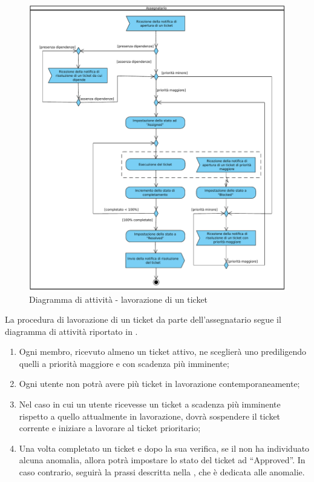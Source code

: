 \begin{figure}[H]
\centering
\includegraphics[width=13cm]{../immagini/lavorazioneTicket.pdf}
\caption{Diagramma di attività - lavorazione di un ticket}
\label{fig:lavorazioneTicket}
\end{figure}
\label{protocolloUtilizzo}
La procedura di lavorazione di un ticket da parte dell’assegnatario segue il diagramma
di attività riportato in .
\begin{enumerate}
\item Ogni membro, ricevuto almeno un ticket attivo, ne sceglierà uno prediligendo quelli a priorità maggiore e con scadenza più imminente;
\item Ogni utente non potrà avere più ticket in lavorazione contemporaneamente;
\item Nel caso in cui un utente ricevesse un ticket a scadenza più imminente rispetto a quello attualmente in lavorazione, dovrà sospendere il ticket corrente e iniziare a lavorare al ticket prioritario;
\item Una volta completato un ticket e dopo la sua verifica, se il \rV non ha individuato alcuna anomalia, allora potrà impostare lo stato del ticket ad ``Approved''. In caso contrario, seguirà la prassi descritta nella , che è dedicata alle anomalie.
\end{enumerate}
